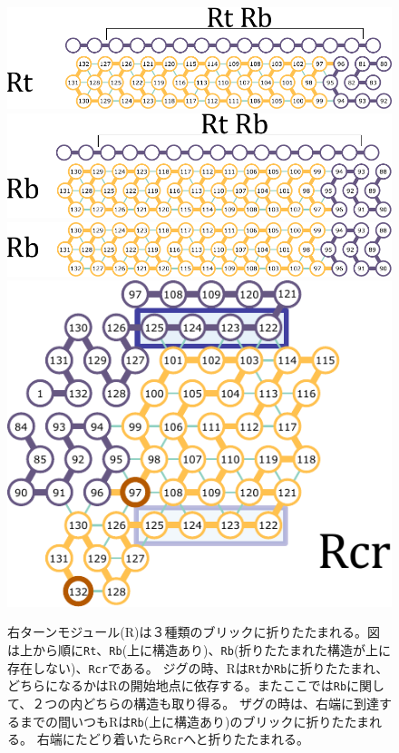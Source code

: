 \documentclass[a4,11pt]{article}
\begin{document}
%
%
\begin{figure}[p]
  \centering
   \includegraphics[width=0.8\linewidth]{fig/svg/Rt_1.pdf}\\
   \vspace*{5mm}
   \includegraphics[width=0.8\linewidth]{fig/svg/Rb_2.pdf}\\
   \vspace*{3mm}
   \includegraphics[width=0.8\linewidth]{fig/svg/Rb_1.pdf}\\
   \vspace*{5mm}
   \includegraphics[width=0.5\linewidth]{fig/svg/Rtr_1.pdf}


 \caption{右ターンモジュール(R)は３種類のブリックに折りたたまれる。図は上から順に\texttt{Rt}、\texttt{Rb}(上に構造あり)、\texttt{Rb}(折りたたまれた構造が上に存在しない)、\texttt{Rcr}である。
 ジグの時、Rは\texttt{Rt}か\texttt{Rb}に折りたたまれ、どちらになるかはRの開始地点に依存する。またここでは\texttt{Rb}に関して、２つの内どちらの構造も取り得る。
ザグの時は、右端に到達するまでの間いつもRは\texttt{Rb}(上に構造あり)のブリックに折りたたまれる。
右端にたどり着いたら\texttt{Rcr}へと折りたたまれる。}
 \label{fig:rightturns}
\end{figure}
%
%
\end{document}
